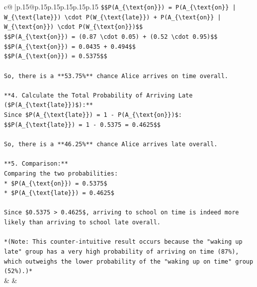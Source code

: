 \documentclass{article}
\begin{document}
{\begin{supertabular}{c@{$\;$}|p{.15\linewidth}@{}p{.15\linewidth}p{.15\linewidth}p{.15\linewidth}p{.15\linewidth}p{.15\linewidth}}
{{{\texttt{\$\$P(A\_\{\textbackslash{}text\{on\}\}) = P(A\_\{\textbackslash{}text\{on\}\} | W\_\{\textbackslash{}text\{late\}\}) \textbackslash{}cdot P(W\_\{\textbackslash{}text\{late\}\}) + P(A\_\{\textbackslash{}text\{on\}\} | W\_\{\textbackslash{}text\{on\}\}) \textbackslash{}cdot P(W\_\{\textbackslash{}text\{on\}\})\$\$} \\
\texttt{\$\$P(A\_\{\textbackslash{}text\{on\}\}) = (0.87 \textbackslash{}cdot 0.05) + (0.52 \textbackslash{}cdot 0.95)\$\$} \\
\texttt{\$\$P(A\_\{\textbackslash{}text\{on\}\}) = 0.0435 + 0.494\$\$} \\
\texttt{\$\$P(A\_\{\textbackslash{}text\{on\}\}) = 0.5375\$\$} \\
\\ 
\texttt{So, there is a **53.75\%** chance Alice arrives on time overall.} \\
\\ 
\texttt{**4. Calculate the Total Probability of Arriving Late (\$P(A\_\{\textbackslash{}text\{late\}\})\$):**} \\
\texttt{Since \$P(A\_\{\textbackslash{}text\{late\}\}) = 1 {-} P(A\_\{\textbackslash{}text\{on\}\})\$:} \\
\texttt{\$\$P(A\_\{\textbackslash{}text\{late\}\}) = 1 {-} 0.5375 = 0.4625\$\$} \\
\\ 
\texttt{So, there is a **46.25\%** chance Alice arrives late overall.} \\
\\ 
\texttt{**5. Comparison:**} \\
\texttt{Comparing the two probabilities:} \\
\texttt{*   \$P(A\_\{\textbackslash{}text\{on\}\}) = 0.5375\$} \\
\texttt{*   \$P(A\_\{\textbackslash{}text\{late\}\}) = 0.4625\$} \\
\\ 
\texttt{Since \$0.5375 > 0.4625\$, arriving to school on time is indeed more likely than arriving to school late overall.} \\
\\ 
\texttt{*(Note: This counter{-}intuitive result occurs because the "waking up late" group has a very high probability of arriving on time (87\%), which outweighs the lower probability of the "waking up on time" group (52\%).)*} \\
            }
        }
    }
    & & \\ \\


\end{supertabular}}
\end{document}
